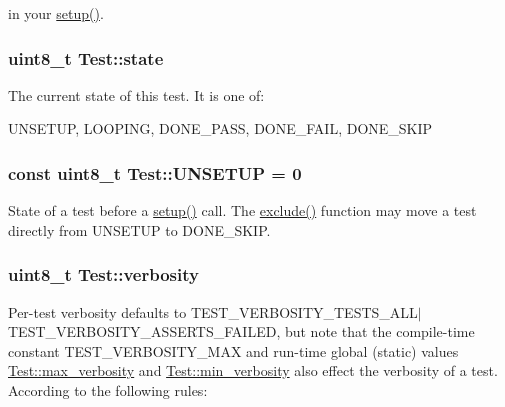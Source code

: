 in your \hyperlink{class_test_a5eed880dda5138db9b40c6a8c3e6b3c3}{setup()}. \hypertarget{class_test_a208f71a142dbf9a369cb0f345bc924dc}{
\subsubsection[{state}]{\setlength{\rightskip}{0pt plus 5cm}uint8\-\_\-t Test\-::state}}\label{class_test_a208f71a142dbf9a369cb0f345bc924dc}
The current state of this test. It is one of\-: \begin{DoxyVerb} UNSETUP, LOOPING, DONE_PASS, DONE_FAIL, DONE_SKIP\end{DoxyVerb}
 \hypertarget{class_test_a73b64ff82076551c6a66f17bed82c1b4}{
\subsubsection[{U\-N\-S\-E\-T\-U\-P}]{\setlength{\rightskip}{0pt plus 5cm}const uint8\-\_\-t Test\-::\-U\-N\-S\-E\-T\-U\-P = 0\hspace{0.3cm}{\ttfamily [static]}}}\label{class_test_a73b64ff82076551c6a66f17bed82c1b4}
State of a test before a \hyperlink{class_test_a5eed880dda5138db9b40c6a8c3e6b3c3}{setup()} call. The \hyperlink{class_test_a00269bd7c55b1c93477be06174280b04}{exclude()} function may move a test directly from U\-N\-S\-E\-T\-U\-P to D\-O\-N\-E\-\_\-\-S\-K\-I\-P. \hypertarget{class_test_aa0489f064ae55a20229646a584110a39}{
\subsubsection[{verbosity}]{\setlength{\rightskip}{0pt plus 5cm}uint8\-\_\-t Test\-::verbosity}}\label{class_test_aa0489f064ae55a20229646a584110a39}
Per-\/test verbosity defaults to T\-E\-S\-T\-\_\-\-V\-E\-R\-B\-O\-S\-I\-T\-Y\-\_\-\-T\-E\-S\-T\-S\-\_\-\-A\-L\-L$|$\-T\-E\-S\-T\-\_\-\-V\-E\-R\-B\-O\-S\-I\-T\-Y\-\_\-\-A\-S\-S\-E\-R\-T\-S\-\_\-\-F\-A\-I\-L\-E\-D, but note that the compile-\/time constant T\-E\-S\-T\-\_\-\-V\-E\-R\-B\-O\-S\-I\-T\-Y\-\_\-\-M\-A\-X and run-\/time global (static) values \hyperlink{class_test_aad3dc21628f5210b9ebdf843eb2b2ae0}{Test\-::max\-\_\-verbosity} and \hyperlink{class_test_a1ff0e4cf27254c988233880fff9e6c6d}{Test\-::min\-\_\-verbosity} also effect the verbosity of a test. According to the following rules\-:


